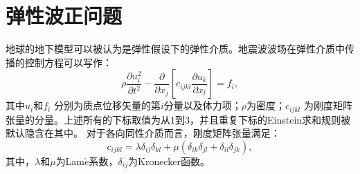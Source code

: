 \section{弹性波正问题}
\label{sec:forward_problem}
地球的地下模型可以被认为是弹性假设下的弹性介质。地震波波场在弹性介质中传播的控制方程可以写作：
\begin{equation}
	\rho \frac{\partial u^2_i}{\partial t^2}  -
	\frac{\partial}{\partial x_j}\left[c_{ijkl}\frac{\partial u_{k}}{\partial
	x_l}\right]=f_i,
	\label{eq:WE} 
\end{equation}
其中$u_i$和$f_i$ 分别为质点位移矢量的第$i$分量以及体力项；$\rho$为密度；$c_{ijkl}$
为刚度矩阵张量的分量。上述所有的下标取值为从1到3，并且重复下标的Einstein求和规则被默认隐含在其中。
对于各向同性介质而言，刚度矩阵张量满足：
\begin{equation}
	c_{ijkl}=\lambda\delta_{ij}\delta
	_{kl}+\mu(\delta_{ik}\delta _{jl}+\delta _{il}\delta_{jk}),
	\label{Lame}
\end{equation}
其中，$\lambda$和$\mu$为Lam$\acute{e}$系数，$\delta_{ij}$为Kronecker函数。 


